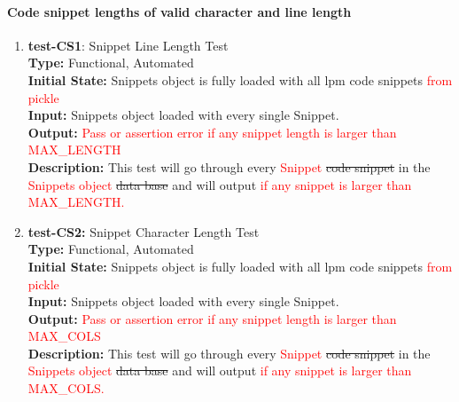 \documentclass[12pt, titlepage]{article}
\begin{document}
\paragraph{Code snippet lengths of valid character and line length}
\begin{enumerate}
\item{\textbf{test-CS1}: Snippet Line Length Test\\}
\textbf{Type:} Functional, Automated \\
\textbf{Initial State:} Snippets object is fully loaded with all lpm code snippets \textcolor{red}{from pickle}\\
\textbf{Input:} Snippets object loaded with every single Snippet. \\
\textbf{Output:} \textcolor{red}{Pass or assertion error if any snippet length is larger than MAX\_LENGTH}\\
\textbf{Description:} This test will go through every \textcolor{red}{Snippet} \sout{code snippet} in the \textcolor{red}{Snippets object} \sout{data base} and will output \textcolor{red}{if any snippet is larger than MAX\_LENGTH.}\\

\item{\textbf{test-CS2:} Snippet Character Length Test\\}
\textbf{Type:} Functional, Automated \\
\textbf{Initial State:} Snippets object is fully loaded with all lpm code snippets \textcolor{red}{from pickle}\\
\textbf{Input:} Snippets object loaded with every single Snippet. \\
\textbf{Output:} \textcolor{red}{Pass or assertion error if any snippet length is larger than MAX\_COLS}\\
\textbf{Description:} This test will go through every \textcolor{red}{Snippet} \sout{code snippet} in the \textcolor{red}{Snippets object} \sout{data base} and will output \textcolor{red}{if any snippet is larger than MAX\_COLS.}\\
\end{enumerate}
\end{document}
